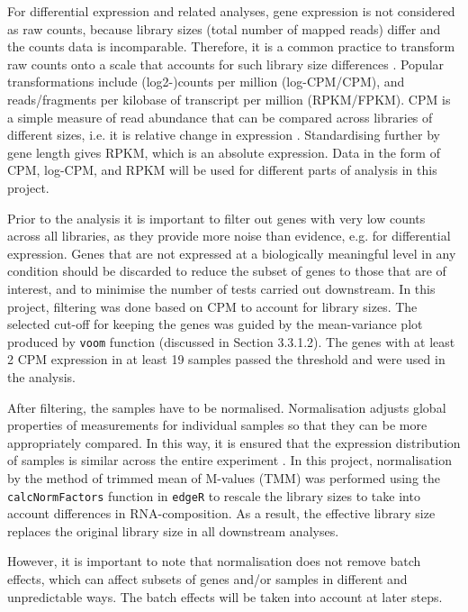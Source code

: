    For differential expression and related analyses, gene expression is not considered as raw counts, because library sizes (total number of mapped reads) differ and the counts data is incomparable. Therefore, it is a common practice to transform raw counts onto a scale that accounts for such library size differences \cite{law2016rna}. Popular transformations include (log2-)counts per million (log-CPM/CPM), and reads/fragments per kilobase of transcript per million (RPKM/FPKM). CPM is a simple measure of read abundance that can be compared across libraries of different sizes, i.e. it is relative change in expression \cite{Law2014}. Standardising further by gene length gives RPKM, which is an absolute expression. Data in the form of CPM, log-CPM, and RPKM will be used for different parts of analysis in this project. 
    
    Prior to the analysis it is important to filter out genes with very low counts across all libraries, as they provide more noise than evidence, e.g. for differential expression. Genes that are not expressed at a biologically meaningful level in any condition should be discarded to reduce the subset of genes to those that are of interest, and to minimise the number of tests carried out downstream. In this project, filtering was done based on CPM to account for library sizes. The selected cut-off for keeping the genes was guided by the mean-variance plot produced by \texttt{voom} function (discussed in Section 3.3.1.2). The genes with at least 2 CPM expression in at least 19 samples passed the threshold and were used in the analysis.
    
    After filtering, the samples have to be normalised. Normalisation adjusts global properties of measurements for individual samples so that they can be more appropriately compared. In this way, it is ensured that the expression distribution of samples is similar across the entire experiment \cite{Robinson2010}. In this project, normalisation by the method of trimmed mean of M-values (TMM) \cite{RobinsonAData} was performed using the \texttt{calcNormFactors} function in \texttt{edgeR} to rescale the library sizes to take into account differences in RNA-composition. As a result, the effective library size replaces the original library size in all downstream analyses. 
    
    However, it is important to note that normalisation does not remove batch effects, which can affect subsets of genes and/or samples in different and unpredictable ways. The batch effects will be taken into account at later steps. 

